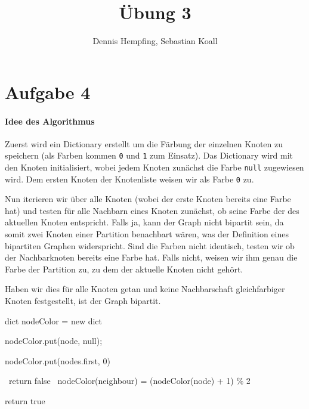 \documentclass[12pt]{scrartcl}%
\theoremstyle{nonumberplain}
\newcommand{\code}[1]{\lstinline[basicstyle=\ttfamily\color{black}]{#1}}
\begin{document}
\author{Dennis Hempfing, Sebastian Koall}
\title{Übung 3}
\date{} 
\pagestyle{myheadings}

\maketitle %

\section*{Aufgabe 4}

\paragraph{Idee des Algorithmus}
Zuerst wird ein Dictionary erstellt um die Färbung der einzelnen Knoten zu speichern (als Farben kommen \code{0} und \code{1} zum Einsatz). 
Das Dictionary wird mit den Knoten initialisiert, wobei jedem Knoten zunächst die Farbe \code{null} zugewiesen wird. Dem ersten Knoten der Knotenliste weisen wir als Farbe \code{0} zu.

Nun iterieren wir über alle Knoten (wobei der erste Knoten bereits eine Farbe hat) und testen für alle Nachbarn eines Knoten zunächst, ob seine Farbe der des aktuellen Knoten entspricht. Falls ja, kann der Graph nicht bipartit sein, da somit zwei Knoten einer Partition benachbart wären, was der Definition eines bipartiten Graphen widerspricht. Sind die Farben nicht identisch, testen wir ob der Nachbarknoten bereits eine Farbe hat. Falls nicht, weisen wir ihm genau die Farbe der Partition zu, zu dem der aktuelle Knoten nicht gehört.

Haben wir dies für alle Knoten getan und keine Nachbarschaft gleichfarbiger Knoten festgestellt, ist der Graph bipartit.

\begin{algorithm}[ht!]
	dict nodeColor = new dict\;
	
	 {
		nodeColor.put(node, null);	
	}
	
	nodeColor.put(nodes.first, 0)\;
	
	 {
		 {
			 {\
				return false\;	
			}  {\
				nodeColor(neighbour) = (nodeColor(node) + 1) \% 2\;
			}
		}		
	}
	
	return true\;
\end{algorithm}
\end{document}
